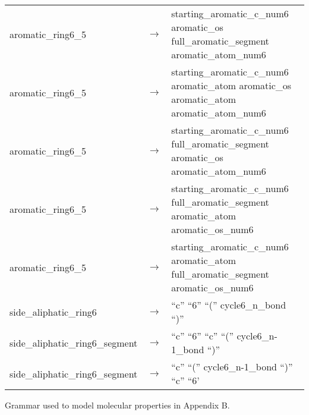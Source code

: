 \documentclass[../Document.tex]{subfiles}
\begin{document}
\begin{longtable}{m{} p{} p{}}
    aromatic\_ring6\_5 & $\rightarrow$ & starting\_aromatic\_c\_num6 aromatic\_os full\_aromatic\_segment aromatic\_atom\_num6 \\
    aromatic\_ring6\_5 & $\rightarrow$ & starting\_aromatic\_c\_num6 aromatic\_atom aromatic\_os aromatic\_atom aromatic\_atom\_num6 \\
    aromatic\_ring6\_5 & $\rightarrow$ & starting\_aromatic\_c\_num6 full\_aromatic\_segment aromatic\_os aromatic\_atom\_num6 \\
    aromatic\_ring6\_5 & $\rightarrow$ & starting\_aromatic\_c\_num6 full\_aromatic\_segment aromatic\_atom aromatic\_os\_num6 \\
    aromatic\_ring6\_5 & $\rightarrow$ & starting\_aromatic\_c\_num6 aromatic\_atom full\_aromatic\_segment aromatic\_os\_num6 \\
    side\_aliphatic\_ring6 & $\rightarrow$ & ``c'' ``6'' ``('' cycle6\_n\_bond ``)'' \\
    side\_aliphatic\_ring6\_segment & $\rightarrow$ & ``c'' ``6'' ``c'' ``('' cycle6\_n-1\_bond ``)'' \\
    side\_aliphatic\_ring6\_segment & $\rightarrow$ & ``c'' ``('' cycle6\_n-1\_bond ``)'' ``c'' ``6'
\end{longtable}
\normalsize



Grammar used to model molecular properties in Appendix B\@.
\end{document}

